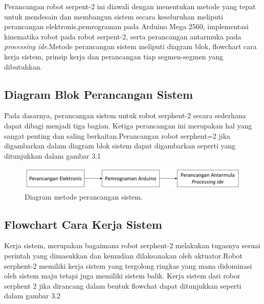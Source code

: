 \begin{table}[H]
	\centering
	\caption{Spesifikasi Robot SCARA}
		\end{table}

 
Perancangan robot serpent-2 ini diawali dengan menentukan metode yang tepat untuk mendesain dan membangun sistem secara keseluruhan meliputi perancangan elektronis,pemrograman pada Arduino Mega 2560, implementasi kinematika robot pada robot serpent-2, serta perancangan antarmuka pada \emph {processing ide}.Metode perancangan sistem meliputi diagram blok, flowchart cara kerja sistem, prinsip kerja dan perancangan tiap segmen-segmen yang dibutuhkan.
	
	\subsection{Diagram Blok Perancangan Sistem}
	Pada dasarnya, perancangan sistem untuk robot serphent-2 secara sederhana dapat dibagi menjadi tiga bagian. Ketiga perancangan ini merupakan hal yang sangat penting dan saling berkaitan.Perancangan robot serphent=2 jika digambarkan dalam diagram blok sistem dapat digambarkan seperti yang ditunjukkan dalam gambar 3.1
	\begin{figure}[H]
		\centering
		\includegraphics[width=\linewidth]{gambar/diagram_blok.jpg}
		\caption{Diagram metode perancangan sistem.}
	\end{figure}

\subsection{Flowchart Cara Kerja Sistem}
Kerja sistem, merupakan bagaimana robot serphent-2 melakukan tugasnya sesuai perintah yang dimasukkan dan kemudian dilaksanakan oleh aktuator.Robot serphent-2 memiliki kerja sistem yang tergolong ringkas yang mana didominasi oleh sistem maju tetapi juga memiliki sistem balik.  Kerja sistem dari robor serphent 2 jika dirancang dalam bentuk flowchat dapat ditunjukkan seperti dalam gambar 3.2

